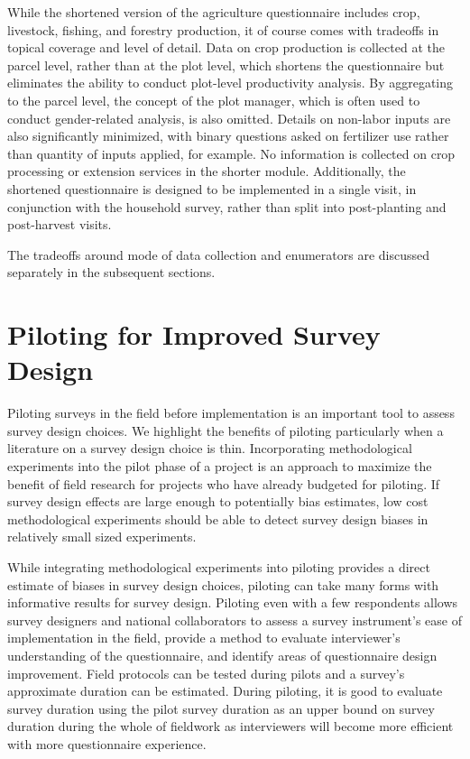 \documentclass[
]{book}
\begin{document}
While the shortened version of the agriculture questionnaire includes crop, livestock, fishing, and forestry production, it of course comes with tradeoffs in topical coverage and level of detail. Data on crop production is collected at the parcel level, rather than at the plot level, which shortens the questionnaire but eliminates the ability to conduct plot-level productivity analysis. By aggregating to the parcel level, the concept of the plot manager, which is often used to conduct gender-related analysis, is also omitted. Details on non-labor inputs are also significantly minimized, with binary questions asked on fertilizer use rather than quantity of inputs applied, for example. No information is collected on crop processing or extension services in the shorter module. Additionally, the shortened questionnaire is designed to be implemented in a single visit, in conjunction with the household survey, rather than split into post-planting and post-harvest visits.

The tradeoffs around mode of data collection and enumerators are discussed separately in the subsequent sections.

\hypertarget{piloting-for-improved-survey-design}{%
\section{Piloting for Improved Survey Design}\label{piloting-for-improved-survey-design}}

Piloting surveys in the field before implementation is an important tool to assess survey design choices. We highlight the benefits of piloting particularly when a literature on a survey design choice is thin. Incorporating methodological experiments into the pilot phase of a project is an approach to maximize the benefit of field research for projects who have already budgeted for piloting. If survey design effects are large enough to potentially bias estimates, low cost methodological experiments should be able to detect survey design biases in relatively small sized experiments.

While integrating methodological experiments into piloting provides a direct estimate of biases in survey design choices, piloting can take many forms with informative results for survey design. Piloting even with a few respondents allows survey designers and national collaborators to assess a survey instrument's ease of implementation in the field, provide a method to evaluate interviewer's understanding of the questionnaire, and identify areas of questionnaire design improvement. Field protocols can be tested during pilots and a survey's approximate duration can be estimated. During piloting, it is good to evaluate survey duration using the pilot survey duration as an upper bound on survey duration during the whole of fieldwork as interviewers will become more efficient with more questionnaire experience.
\end{document}
